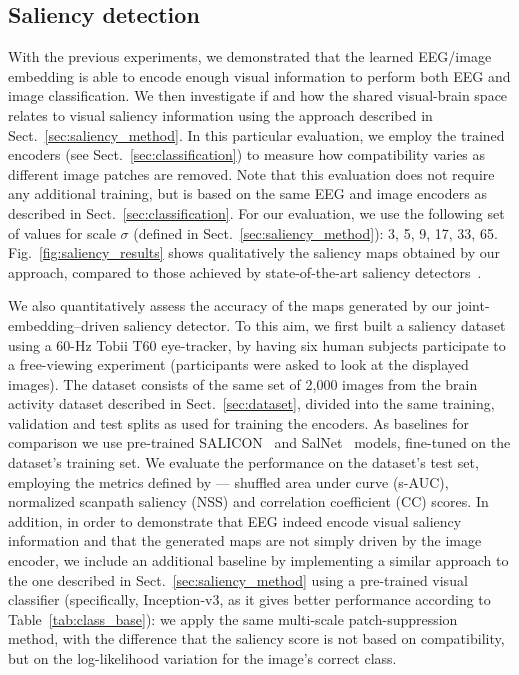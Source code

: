 \documentclass[10pt,journal,compsoc,twocolumn]{IEEEtran}
\begin{document}
\subsection{Saliency detection}\label{sec:saliency}
With the previous experiments, we demonstrated that the learned EEG/image embedding is able to encode enough visual information to perform both EEG and image classification. We then investigate if and how the shared visual-brain space relates to visual saliency information using the approach described in Sect.~\ref{sec:saliency_method}. In this particular evaluation, we employ the trained encoders (see Sect.~\ref{sec:classification}) to measure how compatibility varies as different image patches are removed. Note that this evaluation does not require any additional training, but is based on the same EEG and image encoders as described in Sect.~\ref{sec:classification}. For our evaluation, we use the following set of values for scale $\sigma$ (defined in Sect.~\ref{sec:saliency_method}): 3, 5, 9, 17, 33, 65. Fig.~\ref{fig:saliency_results} shows qualitatively the saliency maps obtained by our approach, compared to those achieved by state-of-the-art saliency detectors~\cite{salicon,salnet}. %

We also quantitatively assess the accuracy of the maps generated by our joint-embedding--driven saliency detector. To this aim, we first built a saliency dataset using a 60-Hz Tobii T60 eye-tracker, by having six human subjects participate to a free-viewing experiment (participants were asked to look at the displayed images). The dataset consists of the same set of 2,000 images from the brain activity dataset described in Sect.~\ref{sec:dataset}, divided into the same training, validation and test splits as used for training the encoders. As baselines for comparison we use pre-trained SALICON~\cite{salicon} and SalNet~\cite{salnet} models, fine-tuned on the dataset's training set. We evaluate the performance on the dataset's test set, employing the metrics defined by \cite{borji2013} --- shuffled area under curve (s-AUC), normalized scanpath saliency (NSS) and correlation coefficient (CC) scores. In addition, in order to demonstrate that EEG indeed encode visual saliency information and that the generated maps are not simply driven by the image encoder, we include an additional baseline by implementing a similar approach to the one described in Sect.~\ref{sec:saliency_method} using a pre-trained visual classifier (specifically, Inception-v3, as it gives better performance according to Table~\ref{tab:class_base}): we apply the same multi-scale patch-suppression method, with the difference that the saliency score is not based on compatibility, but on the log-likelihood variation for the image's correct class. 
\end{document}
